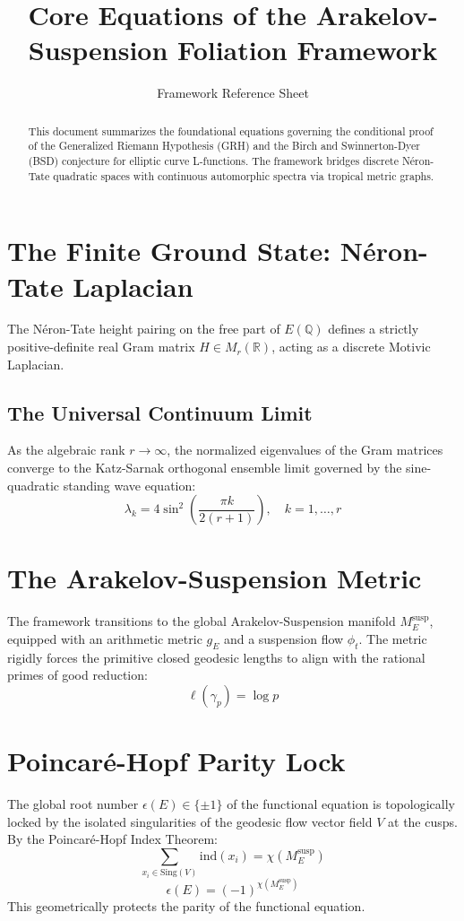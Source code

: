 \documentclass[11pt]{article}
\title{Core Equations of the Arakelov-Suspension Foliation Framework}
\author{Framework Reference Sheet}
\date{}
\begin{document}
\maketitle

\begin{abstract}
This document summarizes the foundational equations governing the conditional proof of the Generalized Riemann Hypothesis (GRH) and the Birch and Swinnerton-Dyer (BSD) conjecture for elliptic curve L-functions. The framework bridges discrete Néron-Tate quadratic spaces with continuous automorphic spectra via tropical metric graphs.
\end{abstract}

\section{The Finite Ground State: Néron-Tate Laplacian}
The Néron-Tate height pairing on the free part of $E(\mathbb{Q})$ defines a strictly positive-definite real Gram matrix $H \in M_r(\mathbb{R})$, acting as a discrete Motivic Laplacian.

\subsection{The Universal Continuum Limit}
As the algebraic rank $r \to \infty$, the normalized eigenvalues of the Gram matrices converge to the Katz-Sarnak orthogonal ensemble limit governed by the sine-quadratic standing wave equation:
\begin{equation}
\lambda_k = 4 \sin^2\left(\frac{\pi k}{2(r+1)}\right), \quad k=1,\dots,r
\end{equation}

\section{The Arakelov-Suspension Metric}
The framework transitions to the global Arakelov-Suspension manifold $M_E^{\mathrm{susp}}$, equipped with an arithmetic metric $g_E$ and a suspension flow $\phi_t$. The metric rigidly forces the primitive closed geodesic lengths to align with the rational primes of good reduction:
\begin{equation}
\ell(\gamma_p) = \log p
\end{equation}

\section{Poincaré-Hopf Parity Lock}
The global root number $\epsilon(E) \in \{\pm 1\}$ of the functional equation is topologically locked by the isolated singularities of the geodesic flow vector field $V$ at the cusps. By the Poincaré-Hopf Index Theorem:
\begin{equation}
\sum_{x_i \in \text{Sing}(V)} \text{ind}(x_i) = \chi(M_E^{\mathrm{susp}})
\end{equation}
\begin{equation}
\epsilon(E) = (-1)^{\chi(M_E^{\mathrm{susp}})}
\end{equation}
This geometrically protects the parity of the functional equation.
\end{document}
